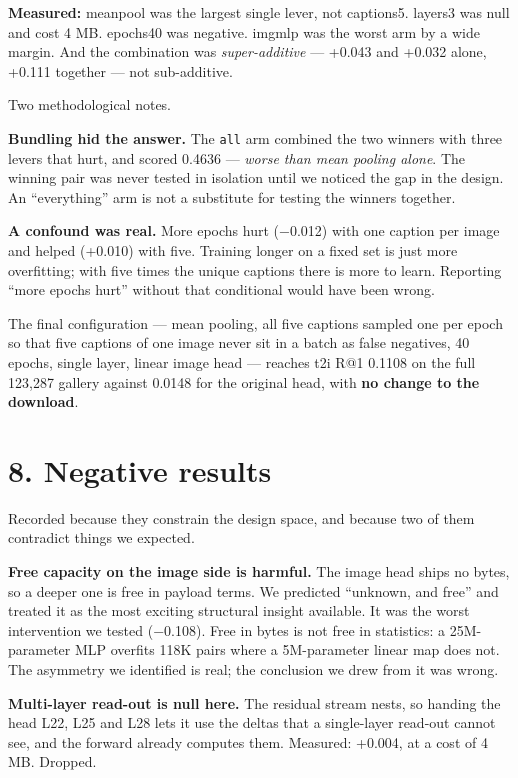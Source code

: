 \documentclass[
  11pt,
]{article}
\begin{document}
\textbf{Measured:} meanpool was the largest single lever, not captions5.
layers3 was null and cost 4 MB. epochs40 was negative. imgmlp was the
worst arm by a wide margin. And the combination was
\emph{super-additive} --- +0.043 and +0.032 alone, +0.111 together ---
not sub-additive.

Two methodological notes.

\textbf{Bundling hid the answer.} The \texttt{all} arm combined the two
winners with three levers that hurt, and scored 0.4636 --- \emph{worse
than mean pooling alone}. The winning pair was never tested in isolation
until we noticed the gap in the design. An ``everything'' arm is not a
substitute for testing the winners together.

\textbf{A confound was real.} More epochs hurt (−0.012) with one caption
per image and helped (+0.010) with five. Training longer on a fixed set
is just more overfitting; with five times the unique captions there is
more to learn. Reporting ``more epochs hurt'' without that conditional
would have been wrong.

The final configuration --- mean pooling, all five captions sampled one
per epoch so that five captions of one image never sit in a batch as
false negatives, 40 epochs, single layer, linear image head --- reaches
t2i R@1 0.1108 on the full 123,287 gallery against 0.0148 for the
original head, with \textbf{no change to the download}.

\section{8. Negative results}\label{negative-results}

Recorded because they constrain the design space, and because two of
them contradict things we expected.

\textbf{Free capacity on the image side is harmful.} The image head
ships no bytes, so a deeper one is free in payload terms. We predicted
``unknown, and free'' and treated it as the most exciting structural
insight available. It was the worst intervention we tested (−0.108).
Free in bytes is not free in statistics: a 25M-parameter MLP overfits
118K pairs where a 5M-parameter linear map does not. The asymmetry we
identified is real; the conclusion we drew from it was wrong.

\textbf{Multi-layer read-out is null here.} The residual stream nests,
so handing the head L22, L25 and L28 lets it use the deltas that a
single-layer read-out cannot see, and the forward already computes them.
Measured: +0.004, at a cost of 4 MB. Dropped.
\end{document}
